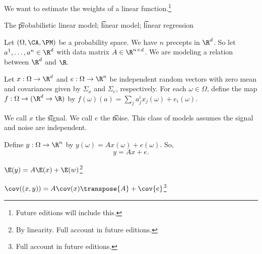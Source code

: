 
We want to estimate the weights of a linear function.\footnote{Future editions will include this.}


The \t{probabilistic linear model}; \t{linear model}; \t{linear regression}

Let $(\Omega, \CA, \PM)$ be a probability space.
We have $n$ precepts in $\R^d$.
So let $a^1, \dots, a^n \in \R^d$ with data matrix $A \in \R^{n \times d}$.
We are modeling a relation between $\R^d$ and $\R$.

Let $x: \Omega \to \R^d$ and $e: \Omega \to \R^n$ be independent random vectors with zero mean and covariances given by $\Sigma_{x}$ and $\Sigma_{e}$, respectively.
For each $\omega \in \Omega$, define the map $f: \Omega \to (\R^d \to \R)$ by $f(\omega)(a) = \sum_{j}a^i_jx_j(\omega) + e_i(\omega)$.

We call $x$ the \t{signal}.
We call $e$ the \t{noise}.
This class of models assumes the signal and noise are independent.

Define $y: \Omega \to \R^n$ by $y(\omega) = Ax(\omega) + e(\omega)$.
So,
\[
  y = Ax + e.
\]

\begin{proposition}
  $\E(y) = A\E(x) + \E(w)$\footnote{By linearity. Full account in future editions.}
\end{proposition}

\begin{proposition}
  $\cov((x, y)) = A\cov(x)\transpose{A} + \cov{e}$\footnote{Full account in future editions.}
\end{proposition}

\blankpage
